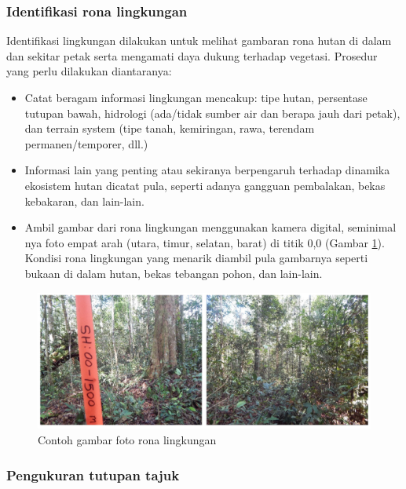 \documentclass[
  oneside]{book}
\providecommand{\tightlist}{%
  \setlength{\itemsep}{0pt}\setlength{\parskip}{0pt}}
\begin{document}
\hypertarget{identifikasi-rona-lingkungan}{%
\subsubsection*{Identifikasi rona lingkungan}\label{identifikasi-rona-lingkungan}}

Identifikasi lingkungan dilakukan untuk melihat gambaran rona hutan di dalam dan sekitar petak serta mengamati daya dukung terhadap vegetasi. Prosedur yang perlu dilakukan diantaranya:

\begin{itemize}
\tightlist
\item
  Catat beragam informasi lingkungan mencakup: tipe hutan, persentase tutupan bawah, hidrologi (ada/tidak sumber air dan berapa jauh dari petak), dan terrain system (tipe tanah, kemiringan, rawa, terendam permanen/temporer, dll.)
\item
  Informasi lain yang penting atau sekiranya berpengaruh terhadap dinamika ekosistem hutan dicatat pula, seperti adanya gangguan pembalakan, bekas kebakaran, dan lain-lain.
\item
  Ambil gambar dari rona lingkungan menggunakan kamera digital, seminimal nya foto empat arah (utara, timur, selatan, barat) di titik 0,0 (Gambar \ref{fig:figrlv}). Kondisi rona lingkungan yang menarik diambil pula gambarnya seperti bukaan di dalam hutan, bekas tebangan pohon, dan lain-lain.
\end{itemize}

\begin{figure}

{\centering \includegraphics[width=1\linewidth]{images/rlv_ilustration} 

}

\caption{Contoh gambar foto rona lingkungan}\label{fig:figrlv}
\end{figure}

\hypertarget{pengukuran-tutupan-tajuk}{%
\subsubsection*{Pengukuran tutupan tajuk}\label{pengukuran-tutupan-tajuk}}
\end{document}
